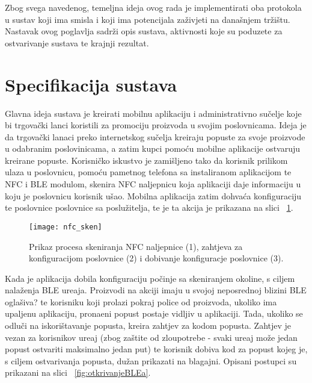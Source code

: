 Zbog svega navedenog, temeljna ideja ovog rada je implementirati oba protokola u sustav koji ima smisla i koji ima potencijala za\v{z}ivjeti na dana\v{s}njem tr\v{z}i\v{s}tu. Nastavak ovog poglavlja sadr\v{z}i opis sustava, aktivnosti koje su poduzete za ostvarivanje sustava te krajnji rezultat.

\section{Specifikacija sustava}

Glavna ideja sustava je kreirati mobilnu aplikaciju i administrativno su\v{c}elje koje bi trgova\v{c}ki lanci koristili za promociju proizvoda u svojim poslovnicama. Ideja je da trgova\v{c}ki lanaci preko internetskog su\v{c}elja kreiraju popuste za svoje proizvode u odabranim poslovinicama, a zatim kupci pomo\'{c}u mobilne aplikacije ostvaruju kreirane popuste. Korisni\v{c}ko iskustvo je zami\v{s}ljeno tako da korisnik prilikom ulaza u poslovnicu, pomo\'{c}u pametnog telefona sa instaliranom aplikacijom te NFC i BLE modulom, skenira NFC naljepnicu koja aplikaciji daje informaciju u koju je poslovnicu korisnik u\v{s}ao. Mobilna aplikacija zatim dohva\'{c}a konfiguraciju te poslovnice poslovnice sa poslu\v{z}itelja, te je ta akcija je prikazana na slici ~\ref{fig:skeniranjeNaljepnice}.

\begin{figure}[!htbp]
	\begin{center}
 \texttt{[image: nfc\_sken]}
 \caption{Prikaz procesa skeniranja NFC naljepnice (1), zahtjeva za konfiguracijom poslovnice (2) i dobivanje konfiguracje poslovnice (3).}
 \label{fig:skeniranjeNaljepnice}
	\end{center}
\end{figure}

Kada je aplikacija dobila konfiguraciju po\v{c}inje sa skeniranjem okoline, s ciljem nala\v{z}enja BLE ure\dj aja. Proizvodi na akciji imaju u svojoj neposrednoj blizini BLE ogla\v{s}iva? te korisniku koji prolazi pokraj police od proizvoda, ukoliko ima upaljenu aplikaciju, prona\dj eni popust postaje vidljiv u aplikaciji. Tada, ukoliko se odlu\v{c}i na iskori\v{s}tavanje popusta, kreira zahtjev za kodom popusta. Zahtjev je vezan za korisnikov ure\dj aj (zbog za\v{s}tite od zloupotrebe - svaki ure\dj aj mo\v{z}e jedan popust ostvariti maksimalno jedan put) te korisnik dobiva kod za popust kojeg je, s ciljem ostvarivanja popusta, du\v{z}an prikazati na blagajni. Opisani postupci su prikazani na slici  ~\ref{fig:otkrivanjeBLEa}.

